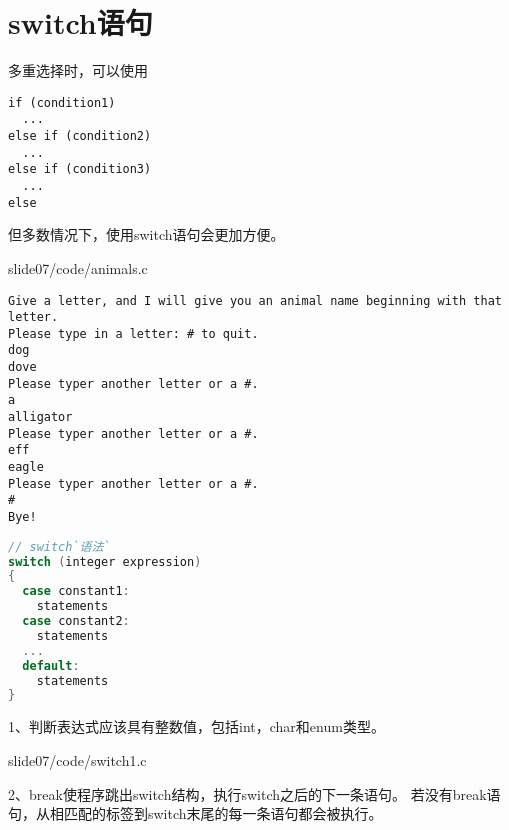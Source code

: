 \section{switch语句}
\begin{frame}[fragile]\ft{\secname}
多重选择时，可以使用
\begin{lstlisting}
if (condition1)
  ...
else if (condition2)
  ...
else if (condition3)
  ...
else    
\end{lstlisting}
但多数情况下，使用switch语句会更加方便。
\end{frame}

\begin{frame}\ft{\secname}

{slide07/code/animals.c}
\end{frame}


\begin{frame}[fragile]\ft{\secname}
\begin{lstlisting}[backgroundcolor=\color{blue!20}]
Give a letter, and I will give you an animal name beginning with that letter.
Please type in a letter: # to quit.
dog
dove
Please typer another letter or a #.
a
alligator
Please typer another letter or a #.
eff
eagle
Please typer another letter or a #.
#
Bye!
\end{lstlisting}
\end{frame}

\begin{frame}[fragile]\ft{\secname}
\begin{lstlisting}[language=c,frame=single]
// switch`语法`
switch (integer expression)
{
  case constant1:
    statements
  case constant2:
    statements
  ...
  default:
    statements
}    
\end{lstlisting}
\end{frame}

\begin{frame}[fragile]\ft{\secname}
  1、判断表达式应该具有整数值，包括int，char和enum类型。
\end{frame}

\begin{frame}[fragile]\ft{\secname}
  
  {slide07/code/switch1.c}
\end{frame}

\begin{frame}[fragile]\ft{\secname}
2、break使程序跳出switch结构，执行switch之后的下一条语句。
若没有break语句，从相匹配的标签到switch末尾的每一条语句都会被执行。
\end{frame}

